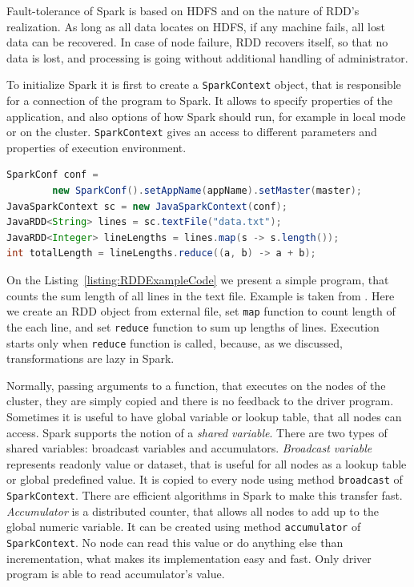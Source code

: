 Fault-tolerance of Spark is based on HDFS and on the nature of RDD's realization.
As long as all data locates on HDFS, if any machine fails, all lost data can be recovered.
In case of node failure, RDD recovers itself, so that no data is lost, and processing is going without additional handling of administrator.

To initialize Spark it is first to create a \lstinline{SparkContext} object, that is responsible for a connection of the program to Spark.
It allows to specify properties of the application, and also options of how Spark should run, for example in local mode or on the cluster.
\lstinline{SparkContext} gives an access to different parameters and properties of execution environment.

\begin{lstlisting}[float=h, caption=Counting the total length of all lines in the file using Spark's RDD object., label=listing:RDDExampleCode, language=Java]
SparkConf conf =
		new SparkConf().setAppName(appName).setMaster(master);
JavaSparkContext sc = new JavaSparkContext(conf);
JavaRDD<String> lines = sc.textFile("data.txt");
JavaRDD<Integer> lineLengths = lines.map(s -> s.length());
int totalLength = lineLengths.reduce((a, b) -> a + b);
\end{lstlisting}

On the Listing~\ref{listing:RDDExampleCode} we present a simple program, that counts the sum length of all lines in the text file.
Example is taken from \cite{Spark1}.
Here we create an RDD object from external file, set \lstinline{map} function to count length of the each line, and set \lstinline{reduce} function to sum up lengths of lines.
Execution starts only when \lstinline{reduce} function is called, because, as we discussed, transformations are lazy in Spark.

Normally, passing arguments to a function, that executes on the nodes of the cluster, they are simply copied and there is no feedback to the driver program.
Sometimes it is useful to have global variable or lookup table, that all nodes can access.
Spark supports the notion of a \textit{shared variable}.
There are two types of shared variables: broadcast variables and accumulators.
\textit{Broadcast variable}  represents readonly value or dataset, that is useful for all nodes as a lookup table or global predefined value.
It is copied to every node using method \lstinline{broadcast} of \lstinline{SparkContext}.
There are efficient algorithms in Spark to make this transfer fast.
\textit{Accumulator}  is a distributed counter, that allows all nodes to add up to the global numeric variable.
It can be created using method \lstinline{accumulator} of \lstinline{SparkContext}.
No node can read this value or do anything else than incrementation, what makes its implementation easy and fast.
Only driver program is able to read accumulator's value.

